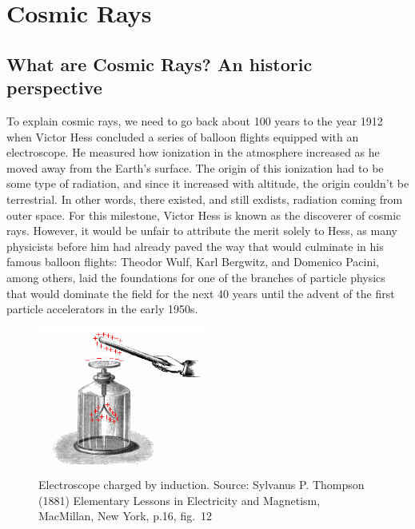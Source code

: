 \documentclass[
  letterpaper,
  DIV=11,
  numbers=noendperiod]{scrreprt}
\begin{document}

\chapter{Cosmic Rays}\label{cosmic-rays}

\section{What are Cosmic Rays? An historic
perspective}\label{what-are-cosmic-rays-an-historic-perspective}

To explain cosmic rays, we need to go back about 100 years to the year
1912 when Victor Hess concluded a series of balloon flights equipped
with an electroscope. He measured how ionization in the atmosphere
increased as he moved away from the Earth's surface. The origin of this
ionization had to be some type of radiation, and since it increased with
altitude, the origin couldn't be terrestrial. In other words, there
existed, and still exdists, radiation coming from outer space. For this
milestone, Victor Hess is known as the discoverer of cosmic rays.
However, it would be unfair to attribute the merit solely to Hess, as
many physicists before him had already paved the way that would
culminate in his famous balloon flights: Theodor Wulf, Karl Bergwitz,
and Domenico Pacini, among others, laid the foundations for one of the
branches of particle physics that would dominate the field for the next
40 years until the advent of the first particle accelerators in the
early 1950s.

\begin{figure}[H]

{\centering \includegraphics[width=0.5\textwidth,height=\textheight]{images/Electroscope_showing_induction.png}

}

\caption{Electroscope charged by induction. Source: Sylvanus P. Thompson
(1881) Elementary Lessons in Electricity and Magnetism, MacMillan, New
York, p.16, fig.~12}

\end{figure}%
\end{document}

